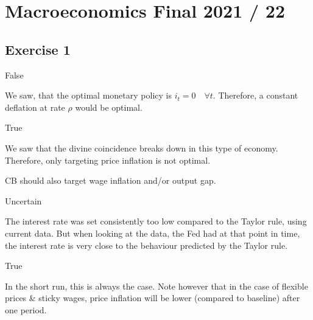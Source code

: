 \section{Macroeconomics Final 2021 / 22}

{
\subsection*{Exercise 1}

\begin{enumerate}[label=(\alph*)]
{\item 
False

We saw, that the optimal monetary policy is $i_{t}=0 \quad \forall t$. Therefore, a constant deflation at rate $\rho$ would be optimal.
}
{
\item 
True

We saw that the divine coincidence breaks down in this type of economy. Therefore, only targeting price inflation is not optimal.

CB should also target wage inflation and/or output gap.
}
{
\item 
Uncertain

The interest rate was set consistently too low compared to the Taylor rule, using current data. But when looking at the data, the Fed had at that point in time, the interest rate is very close to the behaviour predicted by the Taylor rule.
}
{
\item 
True

In the short run, this is always the case. Note however that in the case of flexible prices \& sticky wages, price inflation will be lower (compared to baseline) after one period.
}
\end{enumerate}
}
